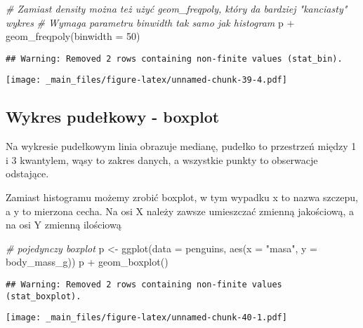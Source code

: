 \documentclass[
]{book}
\newenvironment{Shaded}{\begin{snugshade}}{\end{snugshade}}
\newcommand{\AttributeTok}[1]{\textcolor[rgb]{0.77,0.63,0.00}{#1}}
\newcommand{\CommentTok}[1]{\textcolor[rgb]{0.56,0.35,0.01}{\textit{#1}}}
\newcommand{\DecValTok}[1]{\textcolor[rgb]{0.00,0.00,0.81}{#1}}
\newcommand{\FunctionTok}[1]{\textcolor[rgb]{0.00,0.00,0.00}{#1}}
\newcommand{\NormalTok}[1]{#1}
\newcommand{\OtherTok}[1]{\textcolor[rgb]{0.56,0.35,0.01}{#1}}
\newcommand{\SpecialCharTok}[1]{\textcolor[rgb]{0.00,0.00,0.00}{#1}}
\newcommand{\StringTok}[1]{\textcolor[rgb]{0.31,0.60,0.02}{#1}}
\begin{document}
\begin{Shaded}
\begin{Highlighting}[]
\CommentTok{\# Zamiast density można też użyć geom\_freqpoly, który da bardziej "kanciasty" wykres}
\CommentTok{\# Wymaga parametru binwidth tak samo jak histogram}
\NormalTok{p }\SpecialCharTok{+} \FunctionTok{geom\_freqpoly}\NormalTok{(}\AttributeTok{binwidth =} \DecValTok{50}\NormalTok{)}
\end{Highlighting}
\end{Shaded}

\begin{verbatim}
## Warning: Removed 2 rows containing non-finite values (stat_bin).
\end{verbatim}

\texttt{[image: \_main\_files/figure-latex/unnamed-chunk-39-4.pdf]}

\hypertarget{wykres-pudeux142kowy---boxplot}{%
\subsection{Wykres pudełkowy - boxplot}\label{wykres-pudeux142kowy---boxplot}}

Na wykresie pudełkowym linia obrazuje medianę, pudełko to przestrzeń między 1 i 3 kwantylem, wąsy to zakres danych, a wszystkie punkty to obserwacje odstające.

Zamiast histogramu możemy zrobić boxplot, w tym wypadku x to nazwa szczepu, a y to mierzona cecha. Na osi X należy zawsze umieszczać zmienną jakościową, a na osi Y zmienną ilościową

\begin{Shaded}
\begin{Highlighting}[]
\CommentTok{\# pojedynczy boxplot}
\NormalTok{p }\OtherTok{\textless{}{-}} \FunctionTok{ggplot}\NormalTok{(}\AttributeTok{data =}\NormalTok{ penguins, }\FunctionTok{aes}\NormalTok{(}\AttributeTok{x =} \StringTok{"masa"}\NormalTok{, }\AttributeTok{y =}\NormalTok{ body\_mass\_g))}
\NormalTok{p }\SpecialCharTok{+} \FunctionTok{geom\_boxplot}\NormalTok{()}
\end{Highlighting}
\end{Shaded}

\begin{verbatim}
## Warning: Removed 2 rows containing non-finite values (stat_boxplot).
\end{verbatim}

\texttt{[image: \_main\_files/figure-latex/unnamed-chunk-40-1.pdf]}
\end{document}
